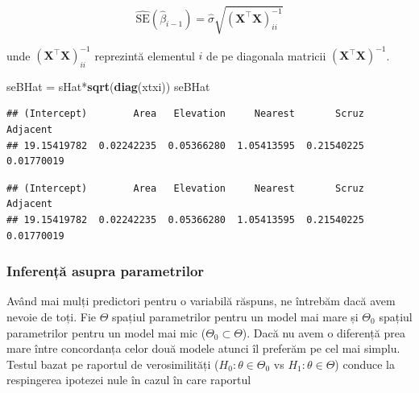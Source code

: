 \documentclass[]{article}
\newenvironment{Shaded}{\begin{snugshade}}{\end{snugshade}}
\newcommand{\KeywordTok}[1]{\textcolor[rgb]{0.13,0.29,0.53}{\textbf{{#1}}}}
\newcommand{\DecValTok}[1]{\textcolor[rgb]{0.00,0.00,0.81}{{#1}}}
\newcommand{\StringTok}[1]{\textcolor[rgb]{0.31,0.60,0.02}{{#1}}}
\newcommand{\CommentTok}[1]{\textcolor[rgb]{0.56,0.35,0.01}{\textit{{#1}}}}
\newcommand{\NormalTok}[1]{{#1}}
\begin{document}
\[
\hat{\mathrm{SE}}(\hat\beta_{i-1}) = \hat{\sigma}\sqrt{(\mathbf{X}^\intercal\mathbf{X})^{-1}_{ii}}
\]

unde \((\mathbf{X}^\intercal\mathbf{X})^{-1}_{ii}\) reprezintă elementul
\(i\) de pe diagonala matricii
\((\mathbf{X}^\intercal\mathbf{X})^{-1}\).

\begin{Shaded}
\begin{Highlighting}[]
\NormalTok{seBHat =}\StringTok{ }\NormalTok{sHat*}\KeywordTok{sqrt}\NormalTok{(}\KeywordTok{diag}\NormalTok{(xtxi))}
\NormalTok{seBHat}
\end{Highlighting}
\end{Shaded}

\begin{verbatim}
## (Intercept)        Area   Elevation     Nearest       Scruz    Adjacent 
## 19.15419782  0.02242235  0.05366280  1.05413595  0.21540225  0.01770019
\end{verbatim}

\begin{Shaded}
\end{Shaded}

\begin{verbatim}
## (Intercept)        Area   Elevation     Nearest       Scruz    Adjacent 
## 19.15419782  0.02242235  0.05366280  1.05413595  0.21540225  0.01770019
\end{verbatim}

\subsubsection{Inferență asupra
parametrilor}\label{inferenta-asupra-parametrilor}

Având mai mulți predictori pentru o variabilă răspuns, ne întrebăm dacă
avem nevoie de toți. Fie \(\Theta\) spațiul parametrilor pentru un model
mai mare și \(\Theta_0\) spațiul parametrilor pentru un model mai mic
(\(\Theta_0\subset \Theta\)). Dacă nu avem o diferență prea mare între
concordanța celor două modele atunci îl preferăm pe cel mai simplu.
Testul bazat pe raportul de verosimilități (\(H_0: \theta\in \Theta_0\)
vs \(H_1: \theta\in\Theta\)) conduce la respingerea ipotezei nule în
cazul în care raportul
\end{document}
